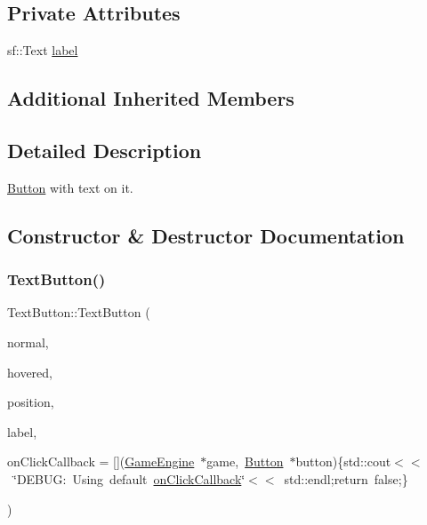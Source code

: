 \subsection*{Private Attributes}
\begin{DoxyCompactItemize}
\item 
sf\+::\+Text \mbox{\hyperlink{class_text_button_af83f98d5e8997c8ddd7f47088ad6159b}{label}}
\end{DoxyCompactItemize}
\subsection*{Additional Inherited Members}


\subsection{Detailed Description}
\mbox{\hyperlink{class_button}{Button}} with text on it. 

\subsection{Constructor \& Destructor Documentation}
\mbox{\label{class_text_button_abb0c1feb5fef0f0716045cae77fe1a42}} 
\subsubsection{\texorpdfstring{TextButton()}{TextButton()}\hspace{0.1cm}{\footnotesize\ttfamily [1/2]}}
{\footnotesize\ttfamily Text\+Button\+::\+Text\+Button (\begin{DoxyParamCaption}\item[{sf\+::\+Texture $\ast$}]{normal,  }\item[{sf\+::\+Texture $\ast$}]{hovered,  }\item[{const sf\+::\+Vector2f \&}]{position,  }\item[{const sf\+::\+Text \&}]{label,  }\item[{bool($\ast$)(\mbox{\hyperlink{class_game_engine}{Game\+Engine}} $\ast$game, \mbox{\hyperlink{class_button}{Button}} $\ast$button)}]{on\+Click\+Callback = {\ttfamily \mbox{[}\mbox{]}(\mbox{\hyperlink{class_game_engine}{Game\+Engine}}~$\ast$game,~\mbox{\hyperlink{class_button}{Button}}~$\ast$button)\{std\+:\+:cout$<$$<$~\char`\"{}DEBUG\+:~Using~default~\mbox{\hyperlink{class_button_abd70dfccd5cce2eb6d4cae1d684107c3}{on\+Click\+Callback}}\char`\"{}$<$$<$~std\+:\+:endl;return~false;\}} }\end{DoxyParamCaption})}

